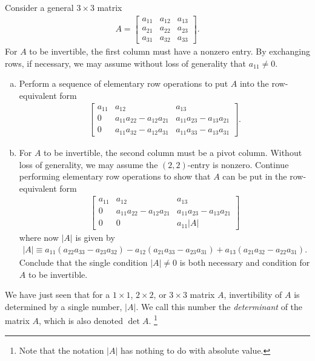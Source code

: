 \documentclass[12pt,letterpaper,reqno]{article}
\numberwithin{equation}{section}
\begin{document}
\begin{exercise}
	Consider a general $3 \times 3$ matrix
\begin{align*}
	A=\begin{bmatrix}
		a_{11} & a_{12} & a_{13} \\
		a_{21} & a_{22} & a_{23} \\
		a_{31} & a_{32} & a_{33}
	\end{bmatrix}.
\end{align*}
For $A$ to be invertible, the first column must have a nonzero entry. By exchanging rows, if necessary, we may assume without loss of generality that $a_{11} \neq 0$.
\begin{enumerate}[(a)]
	\item Perform a sequence of elementary row operations to put $A$ into the row-equivalent form
	\begin{align*}
		\begin{bmatrix}
		a_{11} & a_{12} & a_{13} \\
		0 & a_{11}a_{22}-a_{12}a_{21} & a_{11}a_{23} - a_{13}a_{21} \\
		0 & a_{11}a_{32}-a_{12}a_{31} & a_{11}a_{33}-a_{13}a_{31}
	\end{bmatrix}.
	\end{align*}
	\item For $A$ to be invertible, the second column must be a pivot column. Without loss of generality, we may assume the $(2,2)$-entry is nonzero. Continue performing elementary row operations to show that $A$ can be put in the row-equivalent form
	\begin{align*}
		\begin{bmatrix}
			a_{11} & a_{12} & a_{13} \\
			0 & a_{11}a_{22}-a_{12}a_{21} & a_{11}a_{23}-a_{13}a_{21} \\
			0 & 0 & a_{11}|A|
		\end{bmatrix}
	\end{align*}
	where now $|A|$ is given by 
	\begin{align*}
		|A|\equiv a_{11}(a_{22}a_{33}-a_{23}a_{32})-a_{12}(a_{21}a_{33}-a_{23}a_{31})+a_{13}(a_{21}a_{32}-a_{22}a_{31}).
	\end{align*}
	Conclude that the single condition $|A| \neq 0$ is both necessary and condition for $A$ to be invertible.
\end{enumerate}
\end{exercise}

We have just seen that for a $1 \times 1$, $2 \times 2$, or $3 \times 3$ matrix $A$, invertibility of $A$ is determined by a single number, $|A|$. We call this number the \emph{determinant} of the matrix $A$, which is also denoted $\det A$. \footnote{Note that the notation $|A|$ has nothing to do with absolute value.}
\end{document}
